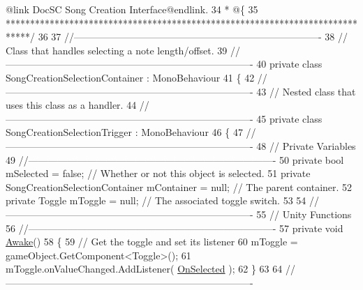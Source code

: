 \begin{DoxyCodeInclude}
{       @link DocSC Song Creation Interface@endlink.}
34 \textcolor{comment}{    * @\{}
35 \textcolor{comment}{    *****************************************************************************/}
36     
37     \textcolor{comment}{//---------------------------------------------------------------------------- }
38     \textcolor{comment}{// Class that handles selecting a note length/offset.}
39     \textcolor{comment}{//----------------------------------------------------------------------------}
40     \textcolor{keyword}{private} \textcolor{keyword}{class }SongCreationSelectionContainer : MonoBehaviour
41     \{
42         \textcolor{comment}{//---------------------------------------------------------------------------- }
43         \textcolor{comment}{// Nested class that uses this class as a handler.}
44         \textcolor{comment}{//---------------------------------------------------------------------------- }
45         \textcolor{keyword}{private} \textcolor{keyword}{class }SongCreationSelectionTrigger : MonoBehaviour
46         \{
47             \textcolor{comment}{//---------------------------------------------------------------------------- }
48             \textcolor{comment}{// Private Variables}
49             \textcolor{comment}{//---------------------------------------------------------------------------- }
50             \textcolor{keyword}{private} \textcolor{keywordtype}{bool} mSelected = \textcolor{keyword}{false}; \textcolor{comment}{// Whether or not this object is selected.}
51             \textcolor{keyword}{private} SongCreationSelectionContainer mContainer = null; \textcolor{comment}{// The parent container.}
52             \textcolor{keyword}{private} Toggle mToggle = null; \textcolor{comment}{// The associated toggle switch.}
53 
54             \textcolor{comment}{//---------------------------------------------------------------------------- }
55             \textcolor{comment}{// Unity Functions}
56             \textcolor{comment}{//---------------------------------------------------------------------------- }
57             \textcolor{keyword}{private} \textcolor{keywordtype}{void} \hyperlink{group___s_c_m_nest_class_ae7264acac3310f5db50df38467734c06}{Awake}()
58             \{
59                 \textcolor{comment}{// Get the toggle and set its listener}
60                 mToggle = gameObject.GetComponent<Toggle>();
61                 mToggle.onValueChanged.AddListener( \hyperlink{group___s_c_m_nest_class_a6477d6c5056af7998063e90e282b67ae}{OnSelected} );
62             \}
63 
64             \textcolor{comment}{//---------------------------------------------------------------------------- }

\end{DoxyCodeInclude}
